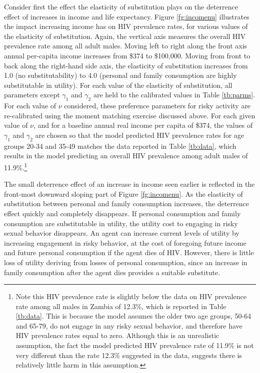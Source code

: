 \documentclass[12pt]{article}
\begin{document}
Consider first the effect the elasticity of substitution plays on the deterrence effect of increases in income and life expectancy.  Figure \ref{fg:incomenu} illustrates the impact increasing income has on HIV prevalence rates, for various values of the elasticity of substitution.  Again, the vertical axis measures the overall HIV prevalence rate among all adult males.  Moving left to right along the front axis annual per-capita income increases from \$374 to \$100,000.  Moving from front to back along the right-hand side axis, the elasticity of substitution increases from 1.0 (no substitutability) to 4.0 (personal and family consumption are highly substitutable in utility).  For each value of the elasticity of substitution, all parameters except $\gamma_1$ and $\gamma_2$ are held to the calibrated values in Table \ref{tb:parms}.  For each value of $\nu$ considered, these preference parameters for risky activity are re-calibrated using the moment matching exercise discussed above.  For each given value of $\nu$, and for a baseline annual real income per capita of \$374, the values of $\gamma_1$ and $\gamma_2$ are chosen so that the model predicted HIV prevalence rates for age groups 20-34 and 35-49 matches the data reported in Table \ref{tb:data}, which results in the model predicting an overall HIV prevalence among adult males of 11.9\%.\footnote{Note this HIV prevalence rate is slightly below the data on HIV prevalence rate among all males in Zambia of 12.3\%, which is reported in Table \ref{tb:data}.  This is because the model assumes the older two age groups, 50-64 and 65-79, do not engage in any risky sexual behavior, and therefore have HIV prevalence rates equal to zero.  Although this is an unrealistic assumption, the fact the model predicted HIV prevalence rate of 11.9\% is not very different than the rate 12.3\% suggested in the data, suggests there is relatively little harm in this assumption.}

The small deterrence effect of an increase in income seen earlier is reflected in the front-most downward sloping part of Figure \ref{fg:incomenu}.  As the elasticity of substitution between personal and family consumption increases, the deterrence effect quickly and completely disappears.  If personal consumption and family consumption are substitutable in utility, the utility cost to engaging in risky sexual behavior disappears.  An agent can increase current levels of utility by increasing engagement in risky behavior, at the cost of foregoing future income and future personal consumption if the agent dies of HIV.  However, there is little loss of utility deriving from losses of personal consumption, since an increase in family consumption after the agent dies provides a suitable substitute.
\end{document}
